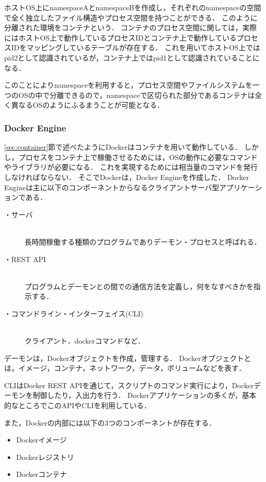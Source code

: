 ホストOS上にnamespaceAとnamespaceBを作成し，それぞれのnamespaceの空間で全く独立したファイル構造やプロセス空間を持つことができる．
このように分離された環境をコンテナという．
コンテナのプロセス空間に関しては，実際にはホストOS上で動作しているプロセスIDとコンテナ上で動作しているプロセスIDをマッピングしているテーブルが存在する．
これを用いてホストOS上ではpid2として認識されているが，コンテナ上ではpid1として認識されていることになる．

このことによりnamespaceを利用すると，プロセス空間やファイルシステムを一つのOSの中で分離できるので，namespaceで区切られた部分であるコンテナは全く異なるOSのようにふるまうことが可能となる．

\subsubsection{Docker Engine}
\ref{sec:container}節で述べたようにDockerはコンテナを用いて動作している．
しかし，プロセスをコンテナ上で稼働させるためには，OSの動作に必要なコマンドやライブラリが必要になる．
これを実現するためには相当量のコマンドを発行しなければならない．
そこでDockerは，Docker Engineを作成した．
Docker Engineは主に以下のコンポーネントからなるクライアントサーバ型アプリケーションである．

\begin{description}
    \item[・サーバ]\mbox{}\\
        長時間稼働する種類のプログラムでありデーモン・プロセスと呼ばれる．
    \item[・REST API]\mbox{}\\
        プログラムとデーモンとの間での通信方法を定義し，何をなすべきかを指示する．
    \item[・コマンドライン・インターフェイス(CLI)]\mbox{}\\
        クライアント．dockerコマンドなど．
\end{description}

デーモンは，Dockerオブジェクトを作成，管理する．
Dockerオブジェクトとは，イメージ，コンテナ，ネットワーク，データ，ボリュームなどを表す．

CLIはDocker REST APIを通じて，スクリプトのコマンド実行により，Dockerデーモンを制御したり，入出力を行う．
Dockerアプリケーションの多くが，基本的なところでこのAPIやCLIを利用している．

また，Dockerの内部には以下の3つのコンポーネントが存在する．

\begin{itemize}
    \item Dockerイメージ
    \item Dockerレジストリ
    \item Dockerコンテナ
\end{itemize}

